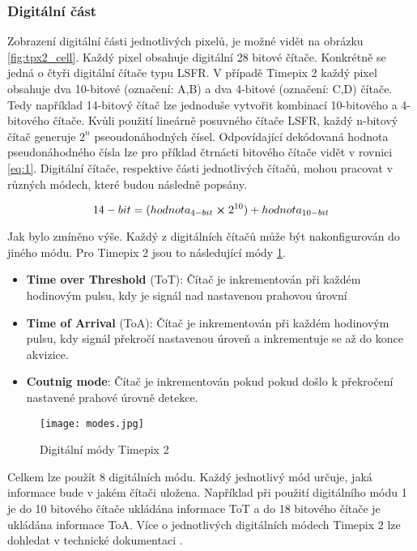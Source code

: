 \subsubsection{Digitální část}
\label{Digitálni cast}
Zobrazení digitální části jednotlivých pixelů, je možné vidět na obrázku \ref{fig:tpx2_cell}. Každý pixel obsahuje digitální 28 bitové čítače. Konkrétně se jedná o čtyři digitální čítače typu LSFR. V případě Timepix 2 každý pixel obsahuje dva 10-bitové (označení: A,B) a dva 4-bitové (označení: C,D) čítače. Tedy například 14-bitový čítač lze jednoduše vytvořit kombinací 10-bitového a 4-bitového čítače. Kvůli použití lineárně posuvného čítače LSFR, každý n-bitový čítač generuje $2^n$ pseoudonáhodných čísel. Odpovídající dekódovaná hodnota pseudonáhodného čísla lze pro příklad čtrnácti bitového čítače vidět v rovnici \ref{eq:1}. Digitální čítače, respektive části jednotlivých čítačů, mohou pracovat v různých módech, které budou následně popsány.

\begin{equation}
	14-bit = (hodnota_{4-bit} \cross 2^{10}) + hodnota_{10-bit}
	\label{eq:1}
\end{equation}

Jak bylo zmíněno výše. Každý z digitálních čítačů může být nakonfigurován do jiného módu. Pro Timepix 2 jsou to následující módy \ref{fig:modes}. 
\begin{itemize}
	\item \textbf{Time over Threshold} (ToT): Čítač je inkrementován při každém hodinovým pulsu, kdy je signál nad nastavenou prahovou úrovní
	\item \textbf{Time of Arrival} (ToA): Čítač je inkrementován při každém hodinovým pulsu, kdy signál překročí nastavenou úroveň a inkrementuje se až do konce akvizice.
	\item \textbf{Coutnig mode}: Čítač je inkrementován pokud pokud došlo k překročení nastavené prahové úrovně detekce.
\end{itemize}
\begin{figure}[h!]
	\centering
	\captionsetup{justification=centering}
	\texttt{[image: modes.jpg]}
	\caption{Digitální módy Timepix 2 \cite{Manek}} 
	\label{fig:modes}
\end{figure}	
\par Celkem lze použít 8 digitálních módu. Každý jednotlivý mód určuje, jaká informace bude v jakém čítači uložena. Například při použití digitálního módu 1 je do 10 bitového čítače ukládána informace ToT a do 18 bitového čítače je ukládána informace ToA. Více o jednotlivých digitálních módech Timepix 2 lze dohledat v technické dokumentaci \cite{tpx2_manual}.

